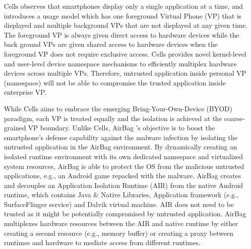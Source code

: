 Cells observes that smartphones display only a single application at a time,
and introduces a usage model which has one foreground Virtual Phone (VP) that
is displayed and multiple background VPs that are not displayed at any given
time. The foreground VP is always given direct access to hardware devices while
the back ground VPs are given shared access to hardware devices when the
foreground VP does not require exclusive access. Cells provides novel
kernel-level and user-level device namespace mechanisms to efficiently
multiplex hardware devices across multiple VPs. Therefore, untrusted
application inside personal VP (namespace) will not be able to compromise the
trusted application inside enterprise VP.

While Cells aims to embrace the emerging Bring-Your-Own-Device (BYOD) paradigm,
each VP is treated equally and the isolation is achieved at the coarse-grained
VP boundary. Unlike Cells, AirBag \cite{AirBag}'s objective is to boost the
smartphone's defense capability against the malware infection by isolating the
untrusted application in the AirBag environment. By dynamically creating an
isolated runtime environment with its own dedicated namespace and virtualized
system resources, AirBag is able to protect the OS from the malicious untrusted
applications, e.g., an Android game repacked with the malware. AirBag creates
and decouples an Application Isolation Runtime (AIR) from the native Android
runtime, which contains Java \& Native Libraries, Application framework (e.g.,
SurfaceFlinger service) and Dalvik virtual machine.  AIR does not need to be
trusted as it might be potentially compromised by untrusted application. AirBag
multiplexes hardware resources between the AIR and native runtime by either
creating a second resource (e.g., memory buffer) or creating a proxy between
runtimes and hardware to mediate access from different runtimes. 


